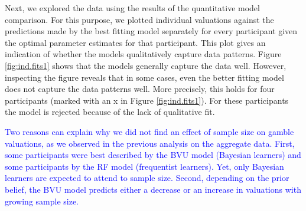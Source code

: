 \documentclass[a4paper, man, natbib, floatsintext]{apa6} %
\begin{document}
Next, we explored the data using the results of the quantitative model comparison. For this purpose, we plotted individual valuations against the predictions made by the best fitting model separately for every participant given the optimal parameter estimates for that participant. This plot gives an indication of whether the models qualitatively capture data patterns. Figure \ref{fig:ind.fits1} shows that the models generally capture the data well. However, inspecting the figure reveals that in some cases, even the better fitting model does not capture the data patterns well. More precisely, this holds for four participants (marked with an x in Figure \ref{fig:ind.fits1}). For these participants the model is rejected because of the lack of qualitative fit.

\textcolor{blue}{Two reasons can explain why we did not find an effect of sample size on gamble valuations, as we observed in the previous analysis on the aggregate data. First, some participants were best described by the BVU model (Bayesian learners) and some participants by the RF model (frequentist learners). Yet, only Bayesian learners are expected to attend to sample size. Second, depending on the prior belief, the BVU model predicts either a decrease or an increase in valuations with growing sample size.}
\end{document}

